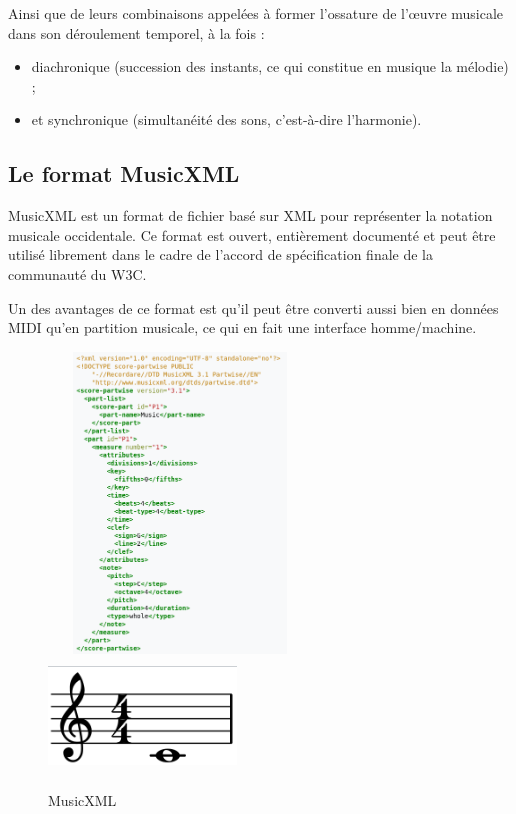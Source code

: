 Ainsi que de leurs combinaisons appelées à former l'ossature de l'œuvre musicale dans son déroulement temporel, à la fois :
\begin{itemize}
	\item diachronique (succession des instants, ce qui constitue en musique la mélodie) ;
	\item et synchronique (simultanéité des sons, c'est-à-dire l'harmonie).
\end{itemize}

\subsection*{Le format MusicXML}
MusicXML est un format de fichier basé sur XML pour représenter la notation musicale occidentale. Ce format est ouvert, entièrement documenté et peut être utilisé librement dans le cadre de l'accord de spécification finale de la communauté du W3C.

Un des avantages de ce format est qu’il peut être converti aussi bien en données MIDI qu’en partition musicale, ce qui en fait une interface homme/machine.

\begin{figure}[h]
	\centering
	\includegraphics[height=80mm, width=70mm]{
    z_images/1_contexte/6_musicxml_0.png}
    \includegraphics[height=30mm, width=50mm]{
    z_images/1_contexte/6_musicxml_1.png}
	\caption{MusicXML} 
	\label{MusicXML}
\end{figure}

